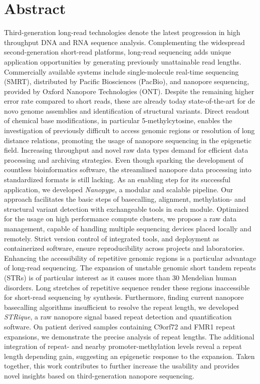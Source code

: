 
\vspace*{10mm}
\section*{Abstract}
\label{sec:abstract}


Third-generation long-read technologies denote the latest progression in high throughput DNA and RNA sequence analysis.
Complementing the widespread second-generation short-read platforms, long-read sequencing adds unique application opportunities by generating previously unattainable read lengths.
Commercially available systems include single-molecule real-time sequencing (SMRT), distributed by Pacific Biosciences (PacBio), and nanopore sequencing, provided by Oxford Nanopore Technologies (ONT).
Despite the remaining higher error rate compared to short reads, these are already today state-of-the-art for de novo genome assemblies and identification of structural variants.
Direct readout of chemical base modifications, in particular 5-methylcytosine, enables the investigation of previously difficult to access genomic regions or resolution of long distance relations, promoting the usage of nanopore sequencing in the epigenetic field.
Increasing throughput and novel raw data types demand for efficient data processing and archiving strategies.
Even though sparking the development of countless bioinformatics software, the streamlined nanopore data processing into standardized formats is still lacking.
As an enabling step for its successful application, we developed \textit{Nanopype}, a modular and scalable pipeline. 
Our approach facilitates the basic steps of basecalling, alignment, methylation- and structural variant detection with exchangeable tools in each module.
Optimized for the usage on high performance compute clusters, we propose a raw data management, capable of handling multiple sequencing devices placed locally and remotely.
Strict version control of integrated tools, and deployment as containerized software, ensure reproducibility across projects and laboratories.
Enhancing the accessibility of repetitive genomic regions is a particular advantage of long-read sequencing.
The expansion of unstable genomic short tandem repeats (STRs) is of particular interest as it causes more than 30 Mendelian human disorders.
Long stretches of repetitive sequence render these regions inaccessible for short-read sequencing by synthesis.
Furthermore, finding current nanopore basecalling algorithms insufficient to resolve the repeat length, we developed \textit{STRique}, a raw nanopore signal based repeat detection and quantification software.
On patient derived samples containing C9orf72 and FMR1 repeat expansions, we demonstrate the precise analysis of repeat lengths.
The additional integration of repeat- and nearby promoter-methylation levels reveal a repeat length depending gain, suggesting an epigenetic response to the expansion.
Taken together, this work contributes to further increase the usability and provides novel insights based on third-generation nanopore sequencing.




